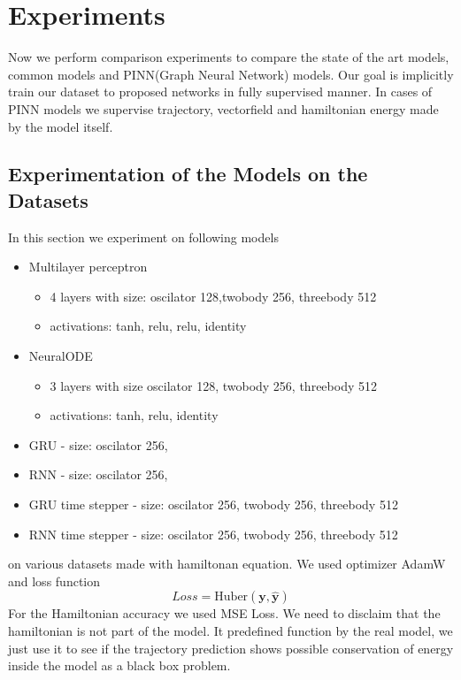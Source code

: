 \chapter{Experiments}
Now we perform comparison experiments to compare the state of the art models, common models and PINN(Graph Neural Network) models. Our goal is implicitly train our dataset to proposed networks in fully supervised manner. In cases of PINN models we supervise trajectory, vectorfield and hamiltonian energy made by the model itself. 

\section{Experimentation of the Models on the Datasets}
In this section we experiment on following models
\begin{itemize}
	\item Multilayer perceptron
	\begin{itemize}
		\item 4 layers with size: oscilator 128,twobody 256, threebody 512
		\item activations: tanh, relu, relu, identity
	\end{itemize}
	
	\item NeuralODE
	\begin{itemize}
		\item 3 layers with size oscilator 128, twobody 256, threebody 512
		\item activations: tanh, relu, identity
	\end{itemize}
	
	\item GRU - size: oscilator 256,
	\item RNN - size: oscilator 256,
	\item GRU time stepper - size: oscilator 256, twobody 256, threebody 512
	\item RNN time stepper - size: oscilator 256, twobody 256, threebody 512
\end{itemize}
on various datasets made with hamiltonan equation.
We used optimizer AdamW and loss function
\begin{equation}
	Loss = \text{Huber}(\mathbf{y},\hat{\mathbf{y}})
\end{equation}
For the Hamiltonian accuracy we used MSE Loss. We need to disclaim that the hamiltonian is not part of the model. It predefined function by the real model, we just use it to see if the trajectory prediction shows possible conservation of energy inside the model as a black box problem. 
